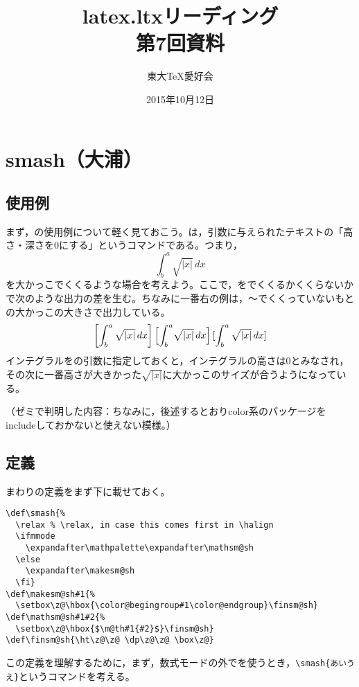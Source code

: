 \documentclass[autodetect-engine,dvipdfmx]{jsarticle}
\begin{document}
\title{ latex.ltxリーディング \\ 第7回資料 }
\author{ 東大\TeX 愛好会 }
\date{2015年10月12日}
\maketitle

\section{smash（大浦）}

\subsection{使用例}

まず，の使用例について軽く見ておこう。は，引数に与えられたテキストの「高さ・深さを0にする」というコマンドである。つまり，
\[
\int^a_b\sqrt{|x|}\,dx
\]
を大かっこでくくるような場合を考えよう。ここで，をでくくるかくくらないかで次のような出力の差を生む。ちなみに一番右の例は，〜でくくっていないもとの大かっこの大きさで出力している。
\[
\left[\int^a_b\sqrt{|x|}\,dx\right] \left[\smash{\int^a_b}\sqrt{|x|}\,dx\right] [\int^a_b\sqrt{|x|}\,dx]
\]
インテグラルをの引数に指定しておくと，インテグラルの高さは0とみなされ，その次に一番高さが大きかった$\sqrt{|x|}$に大かっこのサイズが合うようになっている。

（ゼミで判明した内容：ちなみに，後述するとおりcolor系のパッケージをincludeしておかないと使えない模様。）

\subsection{定義}

まわりの定義をまず下に載せておく。

\latexltx
\begin{lstlisting}[firstnumber=4136]
\def\smash{%
  \relax % \relax, in case this comes first in \halign
  \ifmmode
    \expandafter\mathpalette\expandafter\mathsm@sh
  \else
    \expandafter\makesm@sh
  \fi}
\def\makesm@sh#1{%
  \setbox\z@\hbox{\color@begingroup#1\color@endgroup}\finsm@sh}
\def\mathsm@sh#1#2{%
  \setbox\z@\hbox{$\m@th#1{#2}$}\finsm@sh}
\def\finsm@sh{\ht\z@\z@ \dp\z@\z@ \box\z@}
\end{lstlisting}

この定義を理解するために，まず，数式モードの外でを使うとき，\preSub\verb|\smash{あいうえ}|\preSub というコマンドを考える。
\end{document}

